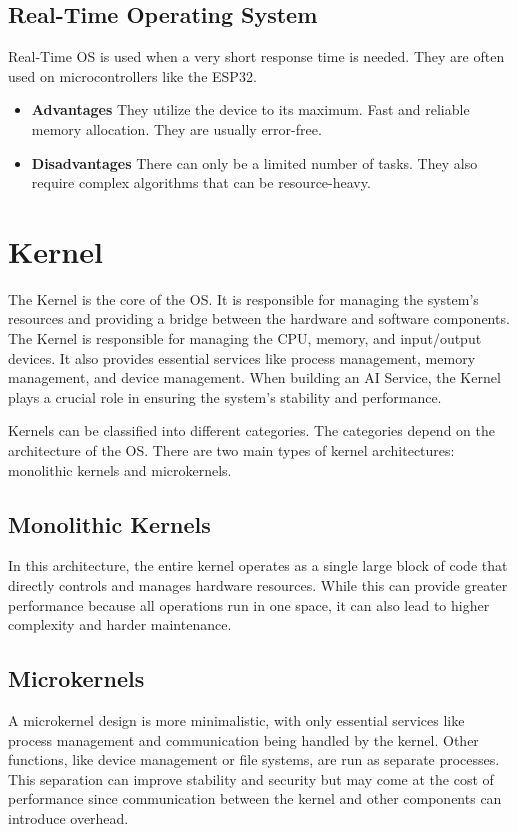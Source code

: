 \subsection{Real-Time Operating System}


Real-Time OS is used when a very short response time is needed. They are often used on microcontrollers like the ESP32.
    \begin{itemize}
        \item \textbf{Advantages} They utilize the device to its maximum. Fast and reliable memory allocation. They are usually error-free.
        \item \textbf{Disadvantages} There can only be a limited number of tasks. They also require complex algorithms that can be resource-heavy.
    \end{itemize} 

\section {Kernel}

The Kernel is the core of the OS. It is responsible for managing the system's resources and providing a bridge between the hardware and software components. The Kernel is responsible for managing the CPU, memory, and input/output devices. It also provides essential services like process management, memory management, and device management.
When building an AI Service, the Kernel plays a crucial role in ensuring the system's stability and performance.

Kernels can  be classified into different categories. The categories depend on the architecture of the OS. There are two main types of kernel architectures: monolithic kernels and microkernels.

\subsection{Monolithic Kernels}
In this architecture, the entire kernel operates as a single large block of code that directly controls and manages hardware resources. While this can provide greater performance because all operations run in one space, it can also lead to higher complexity and harder maintenance.

\subsection{Microkernels}
A microkernel design is more minimalistic, with only essential services like process management and communication being handled by the kernel. Other functions, like device management or file systems, are run as separate processes. This separation can improve stability and security but may come at the cost of performance since communication between the kernel and other components can introduce overhead.

